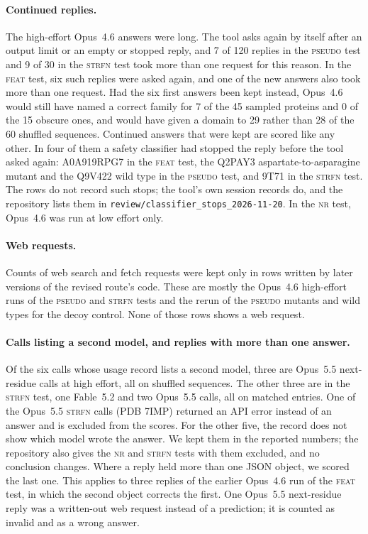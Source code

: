 \documentclass[11pt]{article}
\newcommand{\tnr}{\textmd{\textsc{nr}}}\newcommand{\tfeat}{\textmd{\textsc{feat}}}
\newcommand{\tpseudo}{\textmd{\textsc{pseudo}}}\newcommand{\tstrfn}{\textmd{\textsc{strfn}}}
\begin{document}
\paragraph{Continued replies.} The high-effort Opus~4.6 answers were long. The tool asks again by itself after an output limit or an empty or stopped reply, and 7 of 120 replies in the \tpseudo{} test
and 9 of 30 in the \tstrfn{} test took more than one request for this reason. In the \tfeat{} test, six such replies were asked
again, and one of the new answers also took more than one request. Had the six first answers been kept
instead, Opus~4.6 would still have named a correct family for 7 of the 45 sampled proteins and 0 of the 15
obscure ones, and would have given a domain to 29 rather than 28 of the 60 shuffled sequences. Continued answers that were kept are
scored like any other. In four of them a safety classifier had stopped the reply before the tool asked again:
A0A919RPG7 in the \tfeat{} test, the Q2PAY3 aspartate-to-asparagine mutant and the Q9V422 wild type in the
\tpseudo{} test, and 9T71 in the \tstrfn{} test. The rows do not record such stops; the tool's own session
records do, and the repository lists them in \texttt{review/classifier\_stops\_2026-11-20}. In the \tnr{}
test, Opus~4.6 was run at low effort only.

\paragraph{Web requests.} Counts of web search and fetch requests were kept only in rows written by later versions of the revised
route's code. These are mostly the Opus~4.6 high-effort runs of the \tpseudo{} and \tstrfn{} tests and the rerun of the \tpseudo{}
mutants and wild types for the decoy control. None of those rows shows a web request.

\paragraph{Calls listing a second model, and replies with more than one answer.} Of the six calls whose usage record lists a second model, three are Opus~5.5 next-residue
calls at high effort, all on shuffled sequences. The other three are in the \tstrfn{} test, one Fable~5.2 and two
Opus~5.5 calls, all on matched entries. One of the Opus~5.5 \tstrfn{} calls (PDB 7IMP) returned an
API error instead of an answer and is excluded from the scores. For the other five, the record does not
show which model wrote the answer. We kept them in the reported numbers; the repository also gives the \tnr{} and \tstrfn{} tests with them excluded, and no conclusion changes. Where a reply held more than one JSON object, we
scored the last one. This applies to three replies of the earlier Opus~4.6 run of the \tfeat{} test, in which the
second object corrects the first. One Opus~5.5 next-residue reply was a written-out web request instead
of a prediction; it is counted as invalid and as a wrong answer.
\end{document}
